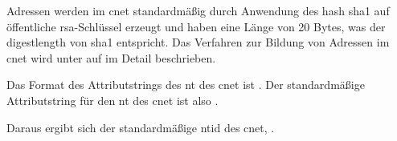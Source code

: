 Adressen werden im \gls{cnet} standardmäßig durch Anwendung des \gls{hash} \gls{sha1} auf öffentliche
\gls{rsa}-Schlüssel erzeugt und haben eine Länge von 20 Bytes, was der \gls{digestlength} von \gls{sha1}
entspricht.
Das Verfahren zur Bildung von Adressen im \gls{cnet} wird unter
 auf  im Detail
beschrieben.

Das Format des Attributstrings des \gls{nt} des \gls{cnet} ist
.
Der standardmäßige Attributstring für den \gls{nt} des \gls{cnet} ist also
\sloppy{\mbox{\code{\cnetattr}}}.

Daraus ergibt sich der standardmäßige \gls{ntid} des \gls{cnet},
\sloppy{\mbox{\code{\cnetid}}}.
